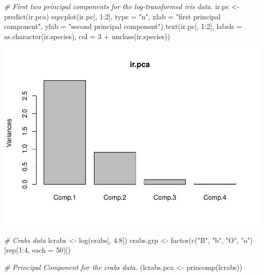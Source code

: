 \documentclass[
]{article}
\newenvironment{Shaded}{\begin{snugshade}}{\end{snugshade}}
\newcommand{\AttributeTok}[1]{\textcolor[rgb]{0.77,0.63,0.00}{#1}}
\newcommand{\CommentTok}[1]{\textcolor[rgb]{0.56,0.35,0.01}{\textit{#1}}}
\newcommand{\DecValTok}[1]{\textcolor[rgb]{0.00,0.00,0.81}{#1}}
\newcommand{\FunctionTok}[1]{\textcolor[rgb]{0.00,0.00,0.00}{#1}}
\newcommand{\NormalTok}[1]{#1}
\newcommand{\OtherTok}[1]{\textcolor[rgb]{0.56,0.35,0.01}{#1}}
\newcommand{\SpecialCharTok}[1]{\textcolor[rgb]{0.00,0.00,0.00}{#1}}
\newcommand{\StringTok}[1]{\textcolor[rgb]{0.31,0.60,0.02}{#1}}
\begin{document}
\begin{Shaded}
\begin{Highlighting}[]
\CommentTok{\# First two principal components for the log{-}transformed iris data.}
\NormalTok{ir.pc }\OtherTok{\textless{}{-}} \FunctionTok{predict}\NormalTok{(ir.pca)}
\FunctionTok{eqscplot}\NormalTok{(ir.pc[, }\DecValTok{1}\SpecialCharTok{:}\DecValTok{2}\NormalTok{], }\AttributeTok{type =} \StringTok{"n"}\NormalTok{,}
         \AttributeTok{xlab =} \StringTok{"first principal component"}\NormalTok{,}
         \AttributeTok{ylab =} \StringTok{"second principal component"}\NormalTok{)}
\FunctionTok{text}\NormalTok{(ir.pc[, }\DecValTok{1}\SpecialCharTok{:}\DecValTok{2}\NormalTok{], }\AttributeTok{labels =} \FunctionTok{as.character}\NormalTok{(ir.species),}
     \AttributeTok{col =} \DecValTok{3} \SpecialCharTok{+} \FunctionTok{unclass}\NormalTok{(ir.species))}
\end{Highlighting}
\end{Shaded}

\includegraphics{modern_applied_statistics_CH11_files/figure-latex/unnamed-chunk-3-1.pdf}

\begin{Shaded}
\begin{Highlighting}[]
\CommentTok{\# Crabs data}
\NormalTok{lcrabs }\OtherTok{\textless{}{-}} \FunctionTok{log}\NormalTok{(crabs[, }\DecValTok{4}\SpecialCharTok{:}\DecValTok{8}\NormalTok{])}
\NormalTok{crabs.grp }\OtherTok{\textless{}{-}} \FunctionTok{factor}\NormalTok{(}\FunctionTok{c}\NormalTok{(}\StringTok{"B"}\NormalTok{, }\StringTok{"b"}\NormalTok{, }\StringTok{"O"}\NormalTok{, }\StringTok{"o"}\NormalTok{)[}\FunctionTok{rep}\NormalTok{(}\DecValTok{1}\SpecialCharTok{:}\DecValTok{4}\NormalTok{, }\AttributeTok{each =} \DecValTok{50}\NormalTok{)])}

\CommentTok{\# Principal Component for the crabs data.}
\NormalTok{(lcrabs.pca }\OtherTok{\textless{}{-}} \FunctionTok{princomp}\NormalTok{(lcrabs))}
\end{Highlighting}
\end{Shaded}
\end{document}
